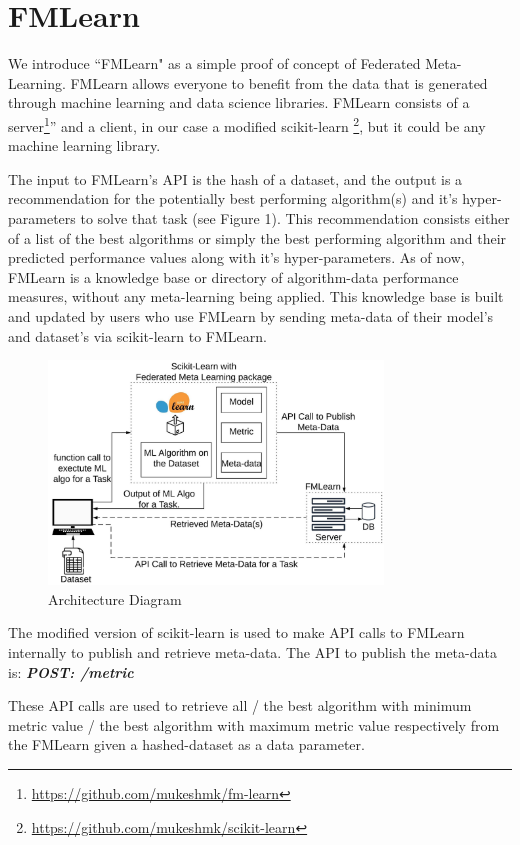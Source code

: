 \documentclass{article}
\begin{document}
\section{FMLearn}
We introduce “FMLearn" as a simple proof of concept of Federated Meta-Learning. FMLearn allows everyone to benefit from the data that is generated through machine learning and data science libraries. FMLearn consists of a server\footnote{\url{https://github.com/mukeshmk/fm-learn}}” and a client, in our case a modified scikit-learn \footnote{\url{https://github.com/mukeshmk/scikit-learn}}, but it could be any machine learning library.

The input to FMLearn's API is the hash of a dataset, and the output is a recommendation for the potentially best performing algorithm(s) and it's hyper-parameters to solve that task (see Figure 1). This recommendation consists either of a list of the best algorithms or simply the best performing algorithm and their predicted performance values along with it's hyper-parameters. As of now, FMLearn is a knowledge base or directory of algorithm-data performance measures, without any meta-learning being applied. This knowledge base is built and updated by users who use FMLearn by sending meta-data of their model’s and dataset’s via scikit-learn to FMLearn.

\begin{figure}[ht]
    \centering
    \includegraphics[width=3.5in]{architecture-diagram.jpeg}
    \caption{Architecture Diagram}
    \label{architecture-diagram}
\end{figure}

The modified version of scikit-learn is used to make API calls to FMLearn internally to publish and retrieve meta-data. The API to publish the meta-data is: 
\textbf{\textit{POST: /metric}}

These API calls are used to retrieve all / the best algorithm with minimum metric value / the best algorithm with maximum metric value respectively from the FMLearn given a hashed-dataset as a data parameter. 
\end{document}
